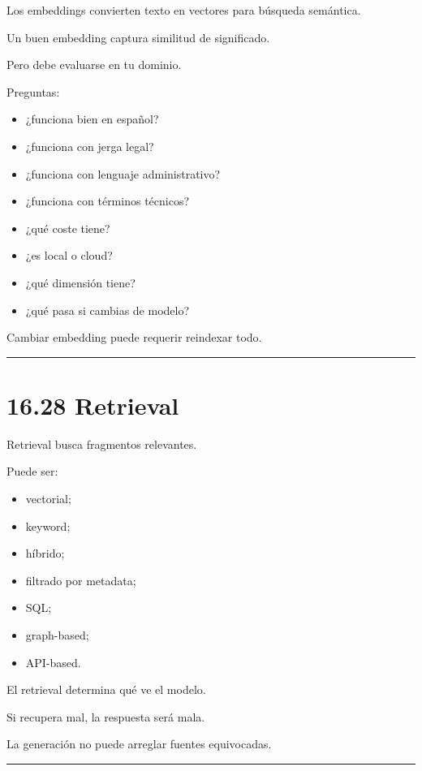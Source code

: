 Los embeddings convierten texto en vectores para búsqueda semántica.

Un buen embedding captura similitud de significado.

Pero debe evaluarse en tu dominio.

Preguntas:

\begin{itemize}
\tightlist
\item
  ¿funciona bien en español?
\item
  ¿funciona con jerga legal?
\item
  ¿funciona con lenguaje administrativo?
\item
  ¿funciona con términos técnicos?
\item
  ¿qué coste tiene?
\item
  ¿es local o cloud?
\item
  ¿qué dimensión tiene?
\item
  ¿qué pasa si cambias de modelo?
\end{itemize}

Cambiar embedding puede requerir reindexar todo.

\begin{center}\rule{0.5\linewidth}{0.5pt}\end{center}

\section{16.28 Retrieval}\label{retrieval}

Retrieval busca fragmentos relevantes.

Puede ser:

\begin{itemize}
\tightlist
\item
  vectorial;
\item
  keyword;
\item
  híbrido;
\item
  filtrado por metadata;
\item
  SQL;
\item
  graph-based;
\item
  API-based.
\end{itemize}

El retrieval determina qué ve el modelo.

Si recupera mal, la respuesta será mala.

La generación no puede arreglar fuentes equivocadas.

\begin{center}\rule{0.5\linewidth}{0.5pt}\end{center}

